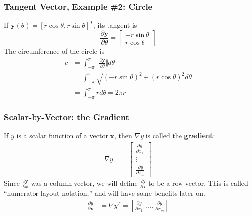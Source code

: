 \documentclass{beamer}
\begin{document}
\begin{frame}
  \frametitle{Tangent Vector, Example \#2: Circle}
  If $\mathbf{y}(\theta)=[r\cos\theta,r\sin\theta]^T$, its tangent is
  \begin{displaymath}
    \frac{\partial\mathbf{y}}{\partial\theta}=
    \left[\begin{array}{c}
        -r\sin\theta\\r\cos\theta
      \end{array}\right]
  \end{displaymath}
  The circumference of the circle is
  \begin{align*}
    c &= \int_{-\pi}^{\pi}\Vert\frac{\partial\mathbf{y}}{\partial\theta}\Vert d\theta\\
    &= \int_{-\pi}^{\pi}\sqrt{(-r\sin\theta)^2+(r\cos\theta)^2}d\theta\\
    &=\int_{-\pi}^\pi rd\theta= 2\pi r
  \end{align*}
\end{frame}

\begin{frame}
  \frametitle{Scalar-by-Vector: the Gradient}

  If $y$ is a scalar function of a vector $\mathbf{x}$, then $\nabla
  y$ is called the {\bf gradient}:
  \begin{align*}
    \nabla y &=
    \left[
      \begin{array}{c}
        \frac{\partial y}{\partial x_1}\\
        \vdots\\
        \frac{\partial y}{\partial x_m}
      \end{array}\right]
  \end{align*}
  Since $\frac{\partial\mathbf{y}}{\partial x}$ was a column vector,
  we will define $\frac{\partial y}{\partial\mathbf{x}}$ to be a row
  vector.  This is called ``numerator layout notation,'' and will have
  some benefits later on.
  \begin{align*}
    \frac{\partial y}{\partial\mathbf{x}}& =\nabla y^T
    =\left[\frac{\partial y}{\partial x_1},\ldots,\frac{\partial y}{\partial x_m}\right]\\
  \end{align*}
\end{frame}
\end{document}
